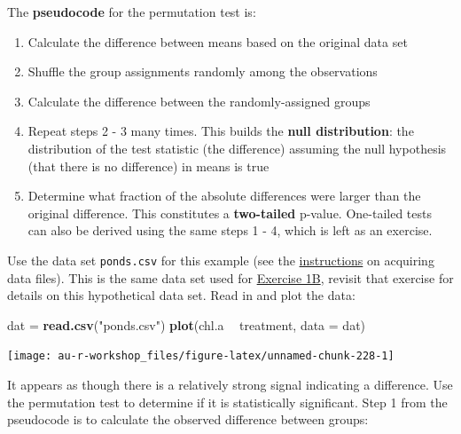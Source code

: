 \documentclass[]{book}
\newenvironment{Shaded}{\begin{snugshade}}{\end{snugshade}}
\newcommand{\DataTypeTok}[1]{\textcolor[rgb]{0.13,0.29,0.53}{#1}}
\newcommand{\KeywordTok}[1]{\textcolor[rgb]{0.13,0.29,0.53}{\textbf{#1}}}
\newcommand{\NormalTok}[1]{#1}
\newcommand{\OperatorTok}[1]{\textcolor[rgb]{0.81,0.36,0.00}{\textbf{#1}}}
\newcommand{\StringTok}[1]{\textcolor[rgb]{0.31,0.60,0.02}{#1}}
\providecommand{\tightlist}{%
  \setlength{\itemsep}{0pt}\setlength{\parskip}{0pt}}
\begin{document}
The \textbf{pseudocode} for the permutation test is:

\begin{enumerate}
\def\labelenumi{\arabic{enumi}.}
\tightlist
\item
  Calculate the difference between means based on the original data set
\item
  Shuffle the group assignments randomly among the observations
\item
  Calculate the difference between the randomly-assigned groups
\item
  Repeat steps 2 - 3 many times. This builds the \textbf{null distribution}: the distribution of the test statistic (the difference) assuming the null hypothesis (that there is no difference) in means is true
\item
  Determine what fraction of the absolute differences were larger than the original difference. This constitutes a \textbf{two-tailed} p-value. One-tailed tests can also be derived using the same steps 1 - 4, which is left as an exercise.
\end{enumerate}

Use the data set \texttt{ponds.csv} for this example (see the \protect\hyperlink{data-sets}{instructions} on acquiring data files). This is the same data set used for \protect\hyperlink{ex1b}{Exercise 1B}, revisit that exercise for details on this hypothetical data set. Read in and plot the data:

\begin{Shaded}
\begin{Highlighting}[]
\NormalTok{dat =}\StringTok{ }\KeywordTok{read.csv}\NormalTok{(}\StringTok{"ponds.csv"}\NormalTok{)}
\KeywordTok{plot}\NormalTok{(chl.a }\OperatorTok{~}\StringTok{ }\NormalTok{treatment, }\DataTypeTok{data =}\NormalTok{ dat)}
\end{Highlighting}
\end{Shaded}

\begin{center}\texttt{[image: au-r-workshop\_files/figure-latex/unnamed-chunk-228-1]} \end{center}

It appears as though there is a relatively strong signal indicating a difference. Use the permutation test to determine if it is statistically significant. Step 1 from the pseudocode is to calculate the observed difference between groups:

\begin{Shaded}
\end{Shaded}
\end{document}
